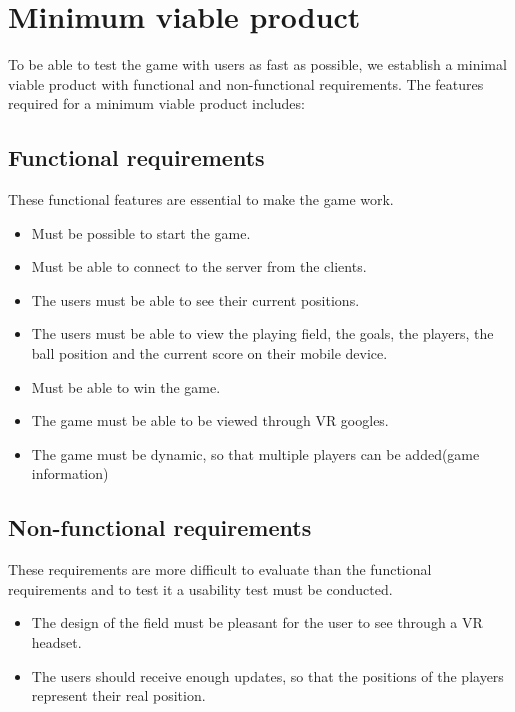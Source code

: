 \section{Minimum viable product}
To be able to test the game with users as fast as possible, we establish a minimal viable product with functional and non-functional requirements.
The features required for a minimum viable product includes:

\subsection{Functional requirements}
These functional features are essential to make the game work.

\begin{itemize}
    \item Must be possible to start the game.
    \item Must be able to connect to the server from the clients.
    \item The users must be able to see their current positions.
    \item The users must be able to view the playing field, the goals, the players, the ball position and the current score on their mobile device.
    \item Must be able to win the game.
    \item The game must be able to be viewed through VR googles.
    \item The game must be dynamic, so that multiple players can be added(game information)
\end{itemize}

\subsection{Non-functional requirements}
These requirements are more difficult to evaluate than the functional requirements and to test it a usability test must be conducted.
\begin{itemize}
    \item The design of the field must be pleasant for the user to see through a VR headset.
    \item The users should receive enough updates, so that the positions of the players represent their real position.
\end{itemize}